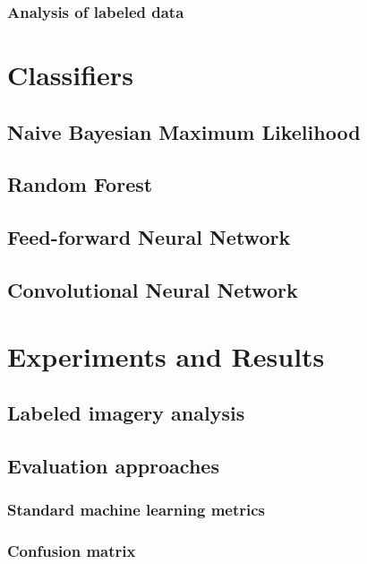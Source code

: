 \documentclass[twoside]{report}
\begin{document}
\subsection{Analysis of labeled data}

\chapter{Classifiers} \label{ch:classifiers}

\section{Naive Bayesian Maximum Likelihood}

\section{Random Forest}

\section{Feed-forward Neural Network}

\section{Convolutional Neural Network}

\chapter{Experiments and Results} \label{ch:experiments}

\section{Labeled imagery analysis}

\section{Evaluation approaches}

\subsection{Standard machine learning metrics}

\subsection{Confusion matrix}
\end{document}
